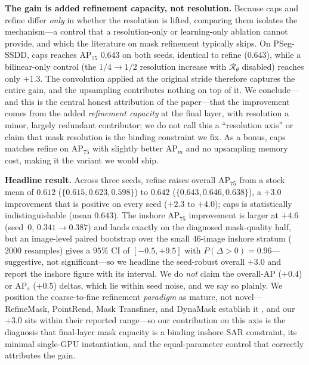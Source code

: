 \textbf{The gain is added refinement capacity, not resolution.} Because \textsf{caps} and \textsf{refine} differ \emph{only} in whether the resolution is lifted, comparing them isolates the mechanism---a control that a resolution-only or learning-only ablation cannot provide, and which the literature on mask refinement typically skips. On PSeg-SSDD, \textsf{caps} reaches AP$_{75}$ $0.643$ on both seeds, identical to \textsf{refine} ($0.643$), while a bilinear-only control (the $1/4\!\rightarrow\!1/2$ resolution increase with $\mathcal{R}_{\theta}$ disabled) reaches only $+1.3$. The convolution applied at the original stride therefore captures the entire gain, and the upsampling contributes nothing on top of it. We conclude---and this is the central honest attribution of the paper---that the improvement comes from the added \emph{refinement capacity} at the final layer, with resolution a minor, largely redundant contributor; we do not call this a ``resolution axis'' or claim that mask resolution is the binding constraint we fix. As a bonus, \textsf{caps} matches \textsf{refine} on AP$_{75}$ with slightly better AP$_m$ and no upsampling memory cost, making it the variant we would ship.

\textbf{Headline result.} Across three seeds, \textsf{refine} raises overall AP$_{75}$ from a stock mean of $0.612$ ($\{0.615,0.623,0.598\}$) to $0.642$ ($\{0.643,0.646,0.638\}$), a $+3.0$ improvement that is positive on every seed ($+2.3$ to $+4.0$); \textsf{caps} is statistically indistinguishable (mean $0.643$). The inshore AP$_{75}$ improvement is larger at $+4.6$ (seed~0, $0.341\!\rightarrow\!0.387$) and lands exactly on the diagnosed mask-quality half, but an image-level paired bootstrap over the small $46$-image inshore stratum ($2000$ resamples) gives a $95\%$ CI of $[-0.5,+9.5]$ with $P(\Delta\!>\!0)=0.96$---suggestive, not significant---so we headline the seed-robust overall $+3.0$ and report the inshore figure with its interval. We do \emph{not} claim the overall-AP ($+0.4$) or AP$_s$ ($+0.5$) deltas, which lie within seed noise, and we say so plainly. We position the coarse-to-fine refinement \emph{paradigm} as mature, not novel---RefineMask, PointRend, Mask Transfiner, and DynaMask establish it \cite{zhang2021refinemask,kirillov2020pointrend,ke2022masktransfiner,li2023dynamask}, and our $+3.0$ sits within their reported range---so our contribution on this axis is the diagnosis that final-layer mask capacity is a binding inshore SAR constraint, its minimal single-GPU instantiation, and the equal-parameter control that correctly attributes the gain.

